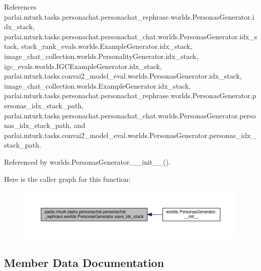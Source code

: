 References parlai.\+mturk.\+tasks.\+personachat.\+personachat\+\_\+rephrase.\+worlds.\+Personas\+Generator.\+idx\+\_\+stack, parlai.\+mturk.\+tasks.\+personachat.\+personachat\+\_\+chat.\+worlds.\+Personas\+Generator.\+idx\+\_\+stack, stack\+\_\+rank\+\_\+evals.\+worlds.\+Example\+Generator.\+idx\+\_\+stack, image\+\_\+chat\+\_\+collection.\+worlds.\+Personality\+Generator.\+idx\+\_\+stack, igc\+\_\+evals.\+worlds.\+I\+G\+C\+Example\+Generator.\+idx\+\_\+stack, parlai.\+mturk.\+tasks.\+convai2\+\_\+model\+\_\+eval.\+worlds.\+Personas\+Generator.\+idx\+\_\+stack, image\+\_\+chat\+\_\+collection.\+worlds.\+Example\+Generator.\+idx\+\_\+stack, parlai.\+mturk.\+tasks.\+personachat.\+personachat\+\_\+rephrase.\+worlds.\+Personas\+Generator.\+personas\+\_\+idx\+\_\+stack\+\_\+path, parlai.\+mturk.\+tasks.\+personachat.\+personachat\+\_\+chat.\+worlds.\+Personas\+Generator.\+personas\+\_\+idx\+\_\+stack\+\_\+path, and parlai.\+mturk.\+tasks.\+convai2\+\_\+model\+\_\+eval.\+worlds.\+Personas\+Generator.\+personas\+\_\+idx\+\_\+stack\+\_\+path.



Referenced by worlds.\+Personas\+Generator.\+\_\+\+\_\+init\+\_\+\+\_\+().

Here is the caller graph for this function\+:
\nopagebreak
\begin{figure}[H]
\begin{center}
\leavevmode
\includegraphics[width=350pt]{classparlai_1_1mturk_1_1tasks_1_1personachat_1_1personachat__rephrase_1_1worlds_1_1PersonasGenerator_afb148eb1f60598db4637faabd8a077f1_icgraph}
\end{center}
\end{figure}


\subsection{Member Data Documentation}
\mbox{\label{classparlai_1_1mturk_1_1tasks_1_1personachat_1_1personachat__rephrase_1_1worlds_1_1PersonasGenerator_a7ed591a1f642f4f9113a90cf68fb11d4}} 
